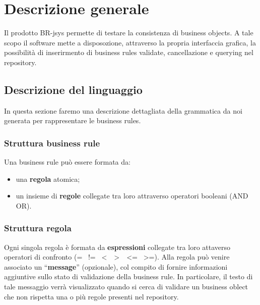 \chapter{Descrizione generale}
Il prodotto BR-jsys permette di testare la consistenza di business objects. A tale scopo il software mette a disposozione, attraverso la propria interfaccia grafica, la possibilit\`a di inserirmento di business rules validate, cancellazione e querying nel repository.
\section{Descrizione del linguaggio}
In questa sezione faremo una descrizione dettagliata della grammatica da noi generata per rappresentare le business rules. 
\subsection{Struttura business rule}
Una business rule pu\`o essere formata da:
\begin{itemize}
\item una \textbf{regola} atomica;
\item un insieme di \textbf{regole} collegate tra loro attraverso operatori booleani (AND \textbar OR).
\end{itemize}
\subsection{Struttura regola}
Ogni singola regola \`e formata da \textbf{espressioni} collegate tra loro attaverso operatori di confronto (= \textbar\ != \textbar\ \textless\ \textbar\ \textgreater\ \textbar\ \textless= \textbar\ \textgreater=). Alla regola pu\`o venire associato un ``\textbf{message}'' (opzionale), col compito di fornire informazioni aggiuntive sullo stato di validazione della business rule. In particolare, il testo di tale messaggio verr\`a visualizzato quando si cerca di validare un business oblect che non rispetta una o pi\`u regole presenti nel repository.
